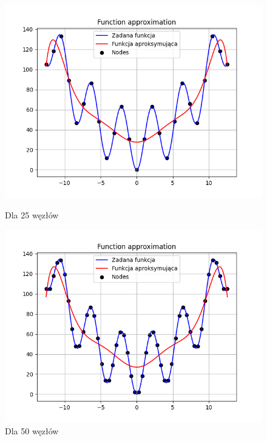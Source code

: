 \documentclass{article}
\begin{document}
\begin{figure}[H]
  \begin{minipage}[b]{0.49\textwidth}
    \begin{minipage}[b]{\textwidth}
      \includegraphics[width=\textwidth]{img36.png}
      \caption{Dla 25 węzłów}
    \end{minipage}
    \vspace*{\fill}
    \begin{minipage}[b]{\textwidth}
      \includegraphics[width=\textwidth]{img37.png}
      \caption{Dla 50 węzłów}
    \end{minipage}
  \end{minipage}
  \hfill
  \begin{minipage}[b]{0.49\textwidth}

\end{minipage}
\end{figure}
\end{document}
